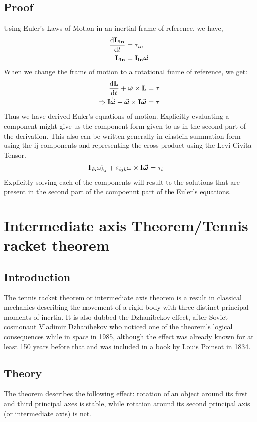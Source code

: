 \documentclass{article}
\begin{document}
\subsection{Proof}
Using Euler's Laws of Motion in an inertial frame of reference, we have,
\begin{align*}
    \dv{\vb{L_{in}}}{t} &= {\tau _{in}}\\
    \vb{L_{in}} &= \vb{I_{in}}\va*{\omega}\\
\end{align*}
When we change the frame of motion to a rotational frame of reference, we get:
\begin{align*}
    \dv{\vb{L}}{t} + \va*{\omega} \times \vb{L} &= {\tau} \\
    \Rightarrow \vb{I}\dot{\va*{\omega}} + \va*{\omega} \times \vb{I}\va*{\omega} &= {\tau}
\end{align*}
Thus we have derived Euler's equations of motion. Explicitly evaluating a component might give us the component form given to us in the second part of the derivation. This also can be written generally in einstein summation form using the ij components and representing the cross product using the Levi-Civita Tensor.
\begin{align}
    \vb{I_{ik}}\dot{\omega_{kj}} + \varepsilon_{ijk}\omega \times \vb{I}\va*{\omega} &= {\tau_i}
\end{align}
Explicitly solving each of the components will result  to the solutions that are present in the second part of the compoennt part of the Euler's equations.
\newpage
\section{Intermediate axis Theorem/Tennis racket theorem}
\subsection{Introduction}
The tennis racket theorem or intermediate axis theorem is a result in classical mechanics describing the movement of a rigid body with three distinct principal moments of inertia. It is also dubbed the Dzhanibekov effect, after Soviet cosmonaut Vladimir Dzhanibekov who noticed one of the theorem's logical consequences while in space in 1985, although the effect was already known for at least 150 years before that and was included in a book by Louis Poinsot in 1834.
\subsection{Theory}
The theorem describes the following effect: rotation of an object around its first and third principal axes is stable, while rotation around its second principal axis (or intermediate axis) is not. 
\end{document}
